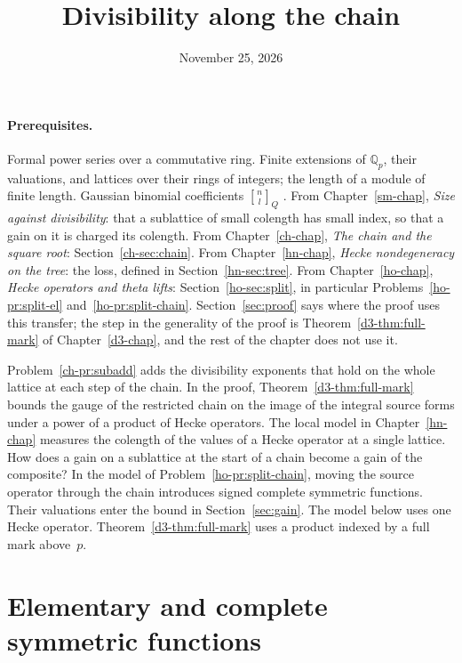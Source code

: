 \documentclass[reqno]{amsart}
\title{Divisibility along the chain}
\author{}
\date{November 25, 2026}
\newcounter{chap}
\theoremstyle{definition}
\theoremstyle{plain}
\theoremstyle{remark}
\newcommand{\Q}{\mathbb{Q}}
\newcommand{\qbinom}[3]{\genfrac{[}{]}{0pt}{}{#1}{#2}_{#3}}
\begin{document}
\maketitle
{}\label{chap}

\paragraph{Prerequisites.}
Formal power series over a commutative ring.  Finite extensions of \(\Q_p\), their valuations, and lattices over their rings of integers; the length of a module of finite length.  Gaussian binomial coefficients \(\qbinom{n}{l}{Q}\) \cite[Ch.~I, \S2, Example~3]{Mac}.  From Chapter~\ref{sm-chap}, \emph{Size against divisibility}: that a sublattice of small colength has small index, so that a gain on it is charged its colength.  From Chapter~\ref{ch-chap}, \emph{The chain and the square root}: Section~\ref{ch-sec:chain}.  From Chapter~\ref{hn-chap}, \emph{Hecke nondegeneracy on the tree}: the loss, defined in Section~\ref{hn-sec:tree}.  From Chapter~\ref{ho-chap}, \emph{Hecke operators and theta lifts}: Section~\ref{ho-sec:split}, in particular Problems~\ref{ho-pr:split-el} and~\ref{ho-pr:split-chain}.  Section~\ref{sec:proof} says where the proof uses this transfer; the step in the generality of the proof is Theorem~\ref{d3-thm:full-mark} of Chapter~\ref{d3-chap}, and the rest of the chapter does not use it.

Problem~\ref{ch-pr:subadd} adds the divisibility exponents that hold on the whole lattice at each step of the chain.  In the proof, Theorem~\ref{d3-thm:full-mark} bounds the gauge of the restricted chain on the image of the integral source forms under a power of a product of Hecke operators.  The local model in Chapter~\ref{hn-chap} measures the colength of the values of a Hecke operator at a single lattice.  How does a gain on a sublattice at the start of a chain become a gain of the composite?  In the model of Problem~\ref{ho-pr:split-chain}, moving the source operator through the chain introduces signed complete symmetric functions.  Their valuations enter the bound in Section~\ref{sec:gain}.  The model below uses one Hecke operator.  Theorem~\ref{d3-thm:full-mark} uses a product indexed by a full mark above~\(p\).

\section{Elementary and complete symmetric functions}\label{sec:sym}
\end{document}
